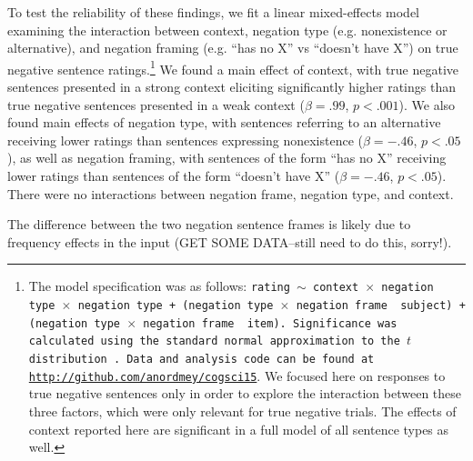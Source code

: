 \documentclass[10pt,letterpaper]{article}
\begin{document}

 
To test the reliability of these findings, we fit a linear mixed-effects model examining the interaction between context, negation type (e.g. nonexistence or alternative), and negation framing (e.g. ``has no X'' vs ``doesn't have X'') on true negative sentence ratings.\footnote{ The model specification was as follows: \texttt{rating $\sim$ context~$\times$~negation type~$\times$~negation type + (negation type~$\times$~negation frame~\textbar~subject) +  (negation type~$\times$~negation frame~\textbar~item).  Significance was calculated using the standard normal approximation to the $t$ distribution \cite{barr2013}. Data and analysis code can be found at \href{http://github.com/anordmey/cogsci15}{http://github.com/anordmey/cogsci15}}.  We focused here on responses to true negative sentences only in order to explore the interaction between these three factors, which were only relevant for true negative trials.  The effects of context reported here are significant in a full model of all sentence types as well.} We found a main effect of context, with true negative sentences presented in a strong context eliciting significantly higher ratings than true negative sentences presented in a weak context ($\beta= .99$, $p< .001$).  We also found main effects of negation type, with sentences referring to an alternative receiving lower ratings than sentences expressing nonexistence ($\beta= -.46$, $p< .05$), as well as negation framing, with sentences of the form ``has no X'' receiving lower ratings than sentences of the form ``doesn't have X''  ($\beta= -.46$, $p< .05$).  There were no interactions between negation frame, negation type, and context.  

The difference between the two negation sentence frames is likely due to frequency effects in the input (GET SOME DATA--still need to do this, sorry!). 
\end{document}
